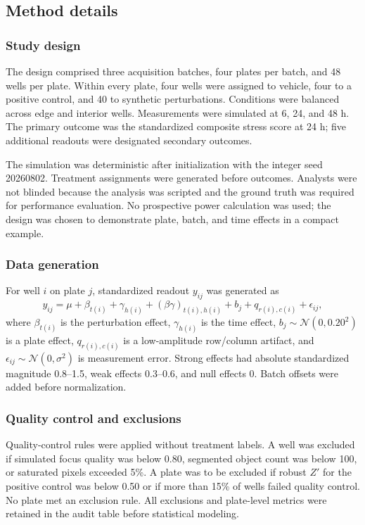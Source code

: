 \subsection{Method details}

\subsubsection{Study design}
The design comprised three acquisition batches, four plates per batch, and 48
wells per plate. Within every plate, four wells were assigned to vehicle, four to
a positive control, and 40 to synthetic perturbations. Conditions were balanced
across edge and interior wells. Measurements were simulated at 6, 24, and 48 h.
The primary outcome was the standardized composite stress score at 24 h; five
additional readouts were designated secondary outcomes.

The simulation was deterministic after initialization with the integer seed
20260802. Treatment assignments were generated before outcomes. Analysts were
not blinded because the analysis was scripted and the ground truth was required
for performance evaluation. No prospective power calculation was used; the
design was chosen to demonstrate plate, batch, and time effects in a compact
example.

\subsubsection{Data generation}
For well $i$ on plate $j$, standardized readout $y_{ij}$ was generated as
\begin{equation}
  y_{ij} = \mu + \beta_{t(i)} + \gamma_{h(i)}
  + (\beta\gamma)_{t(i),h(i)} + b_j + q_{r(i),c(i)} + \epsilon_{ij},
  \label{eq:simulation}
\end{equation}
where $\beta_{t(i)}$ is the perturbation effect, $\gamma_{h(i)}$ is the time
effect, $b_j\sim\mathcal{N}(0,0.20^2)$ is a plate effect,
$q_{r(i),c(i)}$ is a low-amplitude row/column artifact, and
$\epsilon_{ij}\sim\mathcal{N}(0,\sigma^2)$ is measurement error. Strong effects
had absolute standardized magnitude 0.8--1.5, weak effects 0.3--0.6, and null
effects 0. Batch offsets were added before normalization.

\subsubsection{Quality control and exclusions}
Quality-control rules were applied without treatment labels. A well was excluded
if simulated focus quality was below 0.80, segmented object count was below 100,
or saturated pixels exceeded 5\%. A plate was to be excluded if robust $Z'$ for
the positive control was below 0.50 or if more than 15\% of wells failed quality
control. No plate met an exclusion rule. All exclusions and plate-level metrics
were retained in the audit table before statistical modeling.

